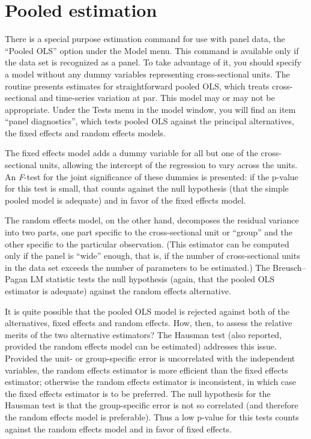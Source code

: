 \section{Pooled estimation}
\label{pooled-est}

There is a special purpose estimation command for use with panel data,
the ``Pooled OLS'' option under the \textsf{Model} menu. This command
is available only if the data set is recognized as a panel.  To take
advantage of it, you should specify a model without any dummy
variables representing cross-sectional units.  The routine presents
estimates for straightforward pooled OLS, which treats cross-sectional
and time-series variation at par.  This model may or may not be
appropriate.  Under the \textsf{Tests} menu in the model window, you
will find an item ``panel diagnostics'', which tests pooled OLS
against the principal alternatives, the fixed effects and random
effects models.

The fixed effects model adds a dummy variable for all but one of the
cross-sectional units, allowing the intercept of the regression to
vary across the units.  An \emph{F}-test for the joint significance of
these dummies is presented: if the p-value for this test is small,
that counts against the null hypothesis (that the simple pooled model
is adequate) and in favor of the fixed effects model.

The random effects model, on the other hand, decomposes the
residual variance into two parts, one part specific to the
cross-sectional unit or ``group'' and the other specific to the
particular observation.  (This estimator can be computed only if the
panel is ``wide'' enough, that is, if the number of cross-sectional
units in the data set exceeds the number of parameters to be
estimated.)  The Breusch--Pagan LM statistic tests the null hypothesis
(again, that the pooled OLS estimator is adequate) against the random
effects alternative.

It is quite possible that the pooled OLS model is rejected against
both of the alternatives, fixed effects and random effects. How, then,
to assess the relative merits of the two alternative estimators?  The
Hausman test (also reported, provided the random effects model can be
estimated) addresses this issue.  Provided the unit- or group-specific
error is uncorrelated with the independent variables, the random
effects estimator is more efficient than the fixed effects estimator;
otherwise the random effects estimator is inconsistent, in which case
the fixed effects estimator is to be preferred.  The null hypothesis
for the Hausman test is that the group-specific error is not so
correlated (and therefore the random effects model is preferable).
Thus a low p-value for this tests counts against the random effects
model and in favor of fixed effects.

